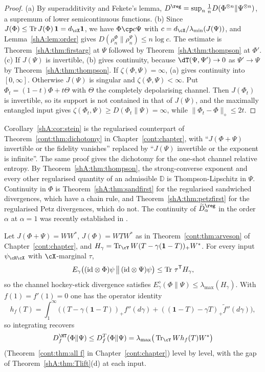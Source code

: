\begin{proof}
(a) By superadditivity and Fekete's lemma, $D^\reg=\sup_n\frac1nD(\Phi^{\otimes n}\|\Psi^{\otimes n})$, a supremum of lower semicontinuous functions. (b) Since $J(\Phi)\le\Tr J(\Phi)\,\mathbf 1=d_\cX\mathbf 1$, we have $\Phi\cp c\Psi$ with $c=d_\cX/\lambda_{\min}(J(\Psi))$, and Lemma~\ref{shA:lem:order} gives $D(\rho^\Phi_n\|\rho^\Psi_n)\le n\log c$. The estimate is Theorem~\ref{shA:thm:firstarg} at $\Psi$ followed by Theorem~\ref{shA:thm:thompson} at $\Phi'$. (c) If $J(\Psi)$ is invertible, (b) gives continuity, because $\dT(\Psi,\Psi')\to0$ as $\Psi'\to\Psi$ by Theorem~\ref{shA:thm:thompson}. If $\zeta(\Phi,\Psi)=\infty$, (a) gives continuity into $[0,\infty]$. Otherwise $J(\Psi)$ is singular and $\zeta(\Phi,\Psi)<\infty$. Put $\Phi_t=(1-t)\Phi+t\Theta$ with $\Theta$ the completely depolarising channel. Then $J(\Phi_t)$ is invertible, so its support is not contained in that of $J(\Psi)$, and the maximally entangled input gives $\zeta(\Phi_t,\Psi)\ge D(\Phi_t\|\Psi)=\infty$, while $\|\Phi_t-\Phi\|_\diamond\le2t$.
\end{proof}

\begin{remark}
Corollary~\ref{shA:cor:stein} is the regularised counterpart of Theorem~\ref{cont:thm:dichotomy} in Chapter~\ref{cont:chapter}, with ``$J(\Phi+\Psi)$ invertible or the fidelity vanishes'' replaced by ``$J(\Psi)$ invertible or the exponent is infinite''. The same proof gives the dichotomy for the one-shot channel relative entropy. By Theorem~\ref{shA:thm:thompson}, the strong-converse exponent and every other regularised quantity of an admissible $\mathbb D$ is Thompson-Lipschitz in $\Psi$. Continuity in $\Phi$ is Theorem~\ref{shA:thm:sandfirst} for the regularised sandwiched divergences, which have a chain rule, and Theorem~\ref{shA:thm:petzfirst} for the regularised Petz divergences, which do not. The continuity of $\widetilde D^\reg_\alpha$ in the order $\alpha$ at $\alpha=1$ was recently established in \cite{WangYang2026}.
\end{remark}

\begin{proposition}\label{shA:prop:channelTlift}
Let $J(\Phi+\Psi)=WW^*$, $J(\Phi)=WTW^*$ as in Theorem~\ref{cont:thm:arveson} of Chapter~\ref{cont:chapter}, and $H_\gamma=\Tr_\cY W(T-\gamma(\mathbf 1-T))_+W^*$. For every input $\psi_{\cR\cX}$ with $\cX$-marginal $\tau$,
\[
E_\gamma\big((\mathrm{id}\otimes\Phi)\psi\,\big\|\,(\mathrm{id}\otimes\Psi)\psi\big)\le\operatorname{Tr}\,\tau^{\mathsf T}H_\gamma ,
\]
so the channel hockey-stick divergence satisfies $E^\diamond_\gamma(\Phi\|\Psi)\le\lambda_{\max}(H_\gamma)$. With $f(1)=f'(1)=0$ one has the operator identity
\[
h_f(T)=\int_1^\infty\big((T-\gamma(\mathbf 1-T))_+f''(d\gamma)+((\mathbf 1-T)-\gamma T)_+\tilde f''(d\gamma)\big),
\]
so integrating recovers
\[
D^\HT_f(\Phi\|\Psi)\le D^T_f(\Phi\|\Psi)=\lambda_{\max}\big(\Tr_\cY Wh_f(T)W^*\big)
\]
(Theorem~\ref{cont:thm:all f} in Chapter~\ref{cont:chapter}) level by level, with the gap of Theorem~\ref{shA:thm:Tlift}(d) at each input.
\end{proposition}

